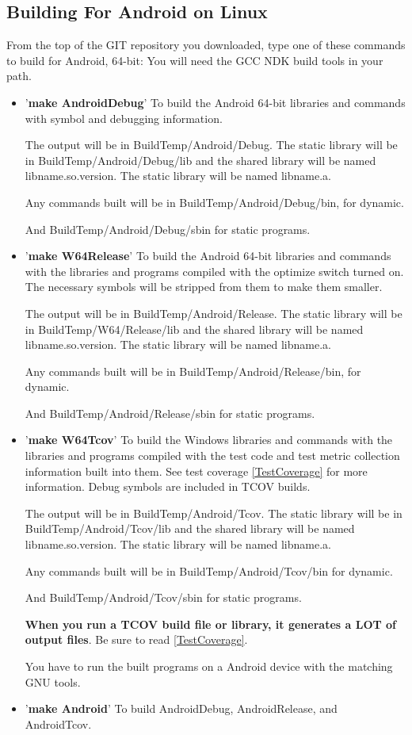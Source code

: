 \subsection{Building For Android on Linux}
  
From the top of the GIT repository you downloaded,
type one of these commands to build for Android, 64-bit:
You will need the GCC NDK build tools in your path.

\begin{itemize}
\item '\textbf{make AndroidDebug}'
  To build the Android 64-bit libraries and commands with symbol
  and debugging information.

  The output will be in BuildTemp/Android/Debug.
  The static library will be in BuildTemp/Android/Debug/lib
  and the shared library will be named lib{name}.so.{version}.
  The static library will be named lib{name}.a.
  
  Any commands built will be in BuildTemp/Android/Debug/bin,
  for dynamic.
  
  And BuildTemp/Android/Debug/sbin for static programs.

\item '\textbf{make W64Release}'
  To build the Android 64-bit libraries and commands with the libraries
  and programs compiled with the optimize switch turned on.
  The necessary symbols will be stripped from them to make
  them smaller.

  The output will be in BuildTemp/Android/Release.
  The static library will be in BuildTemp/W64/Release/lib
  and the shared library will be named lib{name}.so.{version}.
  The static library will be named lib{name}.a.
  
  Any commands built will be in BuildTemp/Android/Release/bin,
  for dynamic.
  
  And BuildTemp/Android/Release/sbin for static programs.
  
\item '\textbf{make W64Tcov}'
  To build the Windows libraries and commands with the libraries
  and programs compiled with the test code and test metric
  collection information built into them.
  See test coverage \ref{TestCoverage} for more information.
  Debug symbols are included in TCOV builds.

  The output will be in BuildTemp/Android/Tcov.
  The static library will be in BuildTemp/Android/Tcov/lib
  and the shared library will be named lib{name}.so.{version}.
  The static library will be named lib{name}.a.
  
  Any commands built will be in BuildTemp/Android/Tcov/bin
  for dynamic.

  And BuildTemp/Android/Tcov/sbin for static programs.

  \textbf{When you run a TCOV build file or library, it generates a LOT of  output files}. Be sure to read \ref{TestCoverage}.

  You have to run the built programs on a Android device
  with the matching GNU tools.
  
\item '\textbf{make Android}'
  To build AndroidDebug, AndroidRelease, and AndroidTcov.
\end{itemize}

